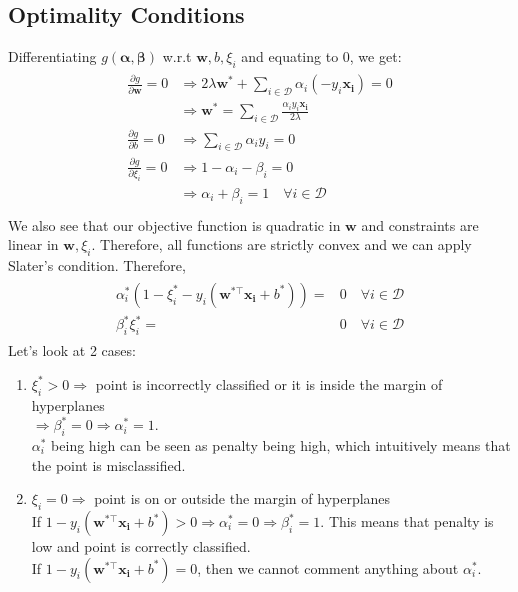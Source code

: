 \documentclass[12pt]{article}
\begin{document}
\subsection{Optimality Conditions}
Differentiating $g(\boldsymbol{\alpha,\beta})$ w.r.t $\boldsymbol{w},b,\xi_i$ and equating to 0, we get:
\begin{gather*}
    \begin{aligned}\frac{\partial g}{\partial \boldsymbol{w}}=0 & \Rightarrow 2\lambda\boldsymbol{w^*}+\sum_{i \in \mathcal{D}} \alpha_i(-y_i\boldsymbol{x_i})=0 \\
    & \Rightarrow \boldsymbol{w^*}=\sum_{i \in \mathcal{D}}\frac{\alpha_iy_i\boldsymbol{x_i}}{2\lambda} \\
    \frac{\partial g}{\partial b}=0 & \Rightarrow \sum_{i \in \mathcal{D}}\alpha_iy_i=0 \\
    \frac{\partial g}{\partial \xi_i}=0 & \Rightarrow 1-\alpha_i-\beta_i=0 \\ 
    & \Rightarrow \alpha_i+\beta_i=1 \quad \forall i \in \mathcal{D} \\ 
    \end{aligned}
\end{gather*}
We also see that our objective function is quadratic in $\boldsymbol{w}$ and constraints are linear in $\boldsymbol{w},\xi_i$. Therefore, all functions are strictly convex and we can apply Slater's condition. Therefore,
\begin{gather*}
    \begin{aligned}
        \alpha_i^*(1-\xi_i^*-y_i(\boldsymbol{w^{*\top}}\boldsymbol{x_i}+b^*))=&0 \quad \forall i \in \mathcal{D}\\
    \beta_i^*\xi_i^*=&0 \quad \forall i \in \mathcal{D}
    \end{aligned}
\end{gather*}
Let's look at 2 cases:
\begin{enumerate}
    \item $\xi_i^* > 0 \Rightarrow$ point is incorrectly classified or it is inside the margin of hyperplanes\\
    $\Rightarrow \beta_i^*=0 \Rightarrow \alpha_i^*=1$.\\ $\alpha_i^*$ being high can be seen as penalty being high, which intuitively means that the point is misclassified.  
    \item $\xi_i = 0 \Rightarrow$ point is on or outside the margin of hyperplanes\\
    If $1-y_i(\boldsymbol{w^{*\top}}\boldsymbol{x_i}+b^*) > 0 \Rightarrow \alpha_i^* =0 \Rightarrow \beta_i^* =1$.
    This means that penalty is low and point is correctly classified.\\
    If $1-y_i(\boldsymbol{w^{*\top}}\boldsymbol{x_i}+b^*) = 0$, then we cannot comment anything about $\alpha_i^*$.
\end{enumerate}
\end{document}
